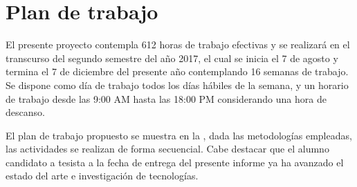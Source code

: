 \chapter{Plan de trabajo}
\label{ch:plan_trabajo}

El presente proyecto contempla 612 horas de trabajo efectivas y se realizará en el transcurso del segundo semestre del año 2017, el cual se inicia el 7 de agosto y termina el 7 de diciembre del presente año contemplando 16 semanas de trabajo. Se dispone como día de trabajo todos los días hábiles de la semana, y un horario de trabajo desde las 9:00 \textsc{AM} hasta las 18:00 \textsc{PM} considerando una hora de descanso.

El plan de trabajo propuesto se muestra en la , dada las metodologías empleadas, las actividades se realizan de forma secuencial. Cabe destacar que el alumno candidato a tesista a la fecha de entrega del presente informe ya ha avanzado el estado del arte e investigación de tecnologías.

